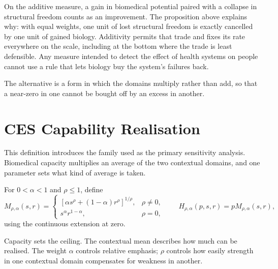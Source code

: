\begin{reading}
On the additive measure, a gain in biomedical potential paired with a collapse
in structural freedom counts as an improvement. The proposition above explains
why: with equal weights, one unit
of lost structural freedom is exactly cancelled by one unit of gained biology.
Additivity permits that trade and fixes its rate
everywhere on the scale, including at the bottom where the trade is least
defensible. Any measure intended to detect the effect of health systems on
people cannot use a rule that lets biology buy the system's failures back.
\end{reading}

The alternative is a form in which the domains multiply rather than add, so
that a near-zero in one cannot be bought off by an excess in another.

\section{CES Capability Realisation}
\label{app:a-ces}

This definition introduces the family used as the primary sensitivity
analysis. Biomedical capacity multiplies an average of the two contextual
domains, and one parameter sets what kind of average is taken.

\begin{definition}
For $0<\alpha<1$ and $\rho\le1$, define
\[
M_{\rho,\alpha}(s,r)=
\begin{cases}
[\alpha s^\rho+(1-\alpha)r^\rho]^{1/\rho},&\rho\ne0,\\
s^\alpha r^{1-\alpha},&\rho=0,
\end{cases}
\qquad
H_{\rho,\alpha}(p,s,r)=pM_{\rho,\alpha}(s,r),
\]
using the continuous extension at zero.
\end{definition}

\begin{remark}
Capacity sets the ceiling. The contextual mean describes how much can be
realised. The weight $\alpha$ controls relative emphasis; $\rho$ controls how
easily strength in one contextual domain compensates for weakness in another.
\end{remark}

